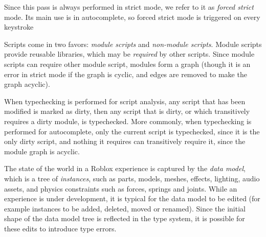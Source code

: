 \documentclass[english,submission,cleveref]{programming}
\begin{document}
Since this pass is always performed in strict mode, we refer to it as
\emph{forced strict} mode. Its main use is in autocomplete, so forced
strict mode is triggered on every keystroke

Scripts come in two favors: \emph{module scripts} and \emph{non-module
scripts}.  Module scripts provide reusable libraries, which may be
\emph{required} by other scripts. Since module scripts can require
other module script, modules form a graph (though it is
an error in strict mode if the graph is cyclic, and edges are removed to
make the graph acyclic).

When typechecking is performed for script analysis, any script that
has been modified is marked as dirty, then any script that is dirty,
or which transitively requires a dirty module, is typechecked. More
commonly, when typechecking is performed for autocomplete, only
the current script is typechecked, since it is the only dirty
script, and nothing it requires can transitively require it, since
the module graph is acyclic.

The state of the world in a {Roblox} experience is captured by
the \emph{data model}, which is a tree of \emph{instances}, such as
parts, models, meshes, effects, lighting, audio assets, and physics
constraints such as forces, springs and joints.
While an experience is under development, it is typical for the data
model to be edited (for example instances to be added, deleted, moved
or renamed). Since the initial shape of the data model tree is reflected in
the type system, it is possible for these edits to introduce type errors.

\end{document}

